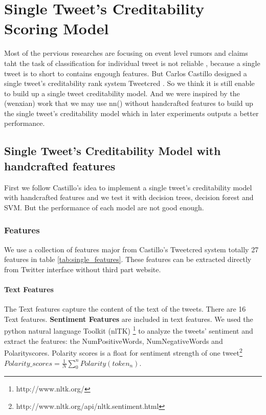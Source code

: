 
\chapter{Single Tweet's Creditability Scoring Model} %
\label{cha:single_tweet_creditbility_scoring_model}
Most of the pervious researches are focusing on event level rumors and claims taht the task of classification for individual tweet is not reliable \cite{liu2015real} \cite{ma2015detect} \cite{zhao2015enquiring}, because a single tweet is to short to contains engough features. But Carlos Castillo designed a single tweet's creditability rank system Tweetcred \cite{gupta2014tweetcred}. So we think it is still enable to build up a single tweet creditability model. And we were inspired by the (wenxian) work that we may use nn() without handcrafted features to build up the single tweet's creditability model which in later experiments outputs a better performance.   
\section{Single Tweet's Creditability Model with handcrafted features} %
First we follow Castillo's \cite{gupta2014tweetcred} idea to implement a single tweet's creditability model with handcrafted features and we test it with decision trees, decision forest and SVM. But the performance of each model are not good enough. 

\subsection{Features}
We use a collection of features major from  Castillo's Tweetcred system\cite{gupta2014tweetcred} totally 27 features in table \ref{tab:single_features}. These features can be extracted directly from Twitter interface without third part website. 
\subsubsection{Text Features}
The Text features capture the content of the text of the tweets. There are 16 Text features. 
\textbf{Sentiment Features} are included in text features.
We used the python natural language Toolkit (nlTK) \footnote{http://www.nltk.org/} to analyze the tweets' sentiment and extract the features: the NumPositiveWords, NumNegativeWords and Polarityscores. Polarity scores is a float for sentiment strength of one tweet\footnote{http://www.nltk.org/api/nltk.sentiment.html} $Polarity\_scores = \frac {1}{N}    \sum_{0}^{n} {Polarity(token_n)}$.

